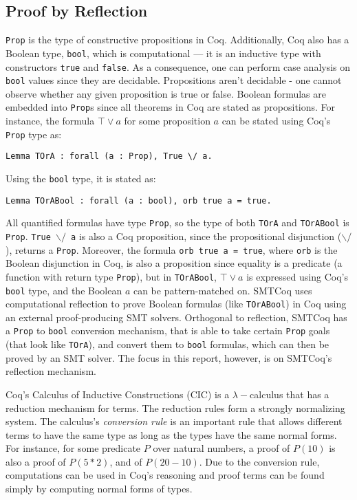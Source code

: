 \documentclass{article}
\begin{document}
	\subsection{Proof by Reflection}
	\label{reflect}
	\texttt{Prop} is the type of 
	constructive propositions in Coq. 
	Additionally, Coq also has a 
	Boolean type, \texttt{bool}, which 
	is computational --- it is an 
	inductive type with constructors 
	\texttt{true} and \texttt{false}. 
	As a consequence, one can 
	perform case analysis on 
	\texttt{bool} values since they 
	are decidable. Propositions 
	aren't decidable - one cannot 
	observe whether any given 
	proposition is true or false. 
	Boolean formulas are embedded 
	into \texttt{Prop}s since all 
	theorems in Coq are stated as 
	propositions. For instance, the 
	formula 
	$\top \lor a$ for some 
	proposition $a$ can be stated 
	using Coq's \texttt{Prop} type as:
\begin{verbatim}
Lemma TOrA : forall (a : Prop), True \/ a.
\end{verbatim}
	Using the \texttt{bool} type, it 
	is stated as:
\begin{verbatim}
Lemma TOrABool : forall (a : bool), orb true a = true.
\end{verbatim}
 	All quantified formulas have type
 	\texttt{Prop}, so the type of both
 	\texttt{TOrA} and \texttt{TOrABool}
 	is \texttt{Prop}. 
 	\texttt{True $\backslash/$ a}
 	is also a Coq proposition, since 
 	the propositional disjunction
 	(\texttt{$\backslash/$}), returns a 
 	\texttt{Prop}. Moreover, the 
 	formula \texttt{orb true a = true}, 
 	where \texttt{orb} is the 
 	Boolean disjunction in Coq, 
 	is also a proposition since 
 	equality is a predicate 
 	(a function with return 
 	type \texttt{Prop}), but in 
 	\texttt{TOrABool}, $\top \lor a$ 
 	is expressed using Coq's 
 	\texttt{bool} type, and the 
 	Boolean $a$ can be pattern-matched 
 	on. SMTCoq uses computational 
 	reflection to prove Boolean 
 	formulas (like \texttt{TOrABool})
 	in Coq using an external 
	proof-producing SMT solvers. 
	Orthogonal to reflection, 
	SMTCoq has a \texttt{Prop} to 
	\texttt{bool} conversion 
	mechanism, that is able to take 
	certain \texttt{Prop}
	goals (that look like 
	\texttt{TOrA}), and convert 
	them to \texttt{bool} formulas, 
	which can then be proved by 
	an SMT solver. The focus in 
	this report, however,  
	is on SMTCoq's reflection 
	mechanism.
	 
	Coq's Calculus of Inductive 
	Constructions (CIC) is a 
	$\lambda-$calculus that has a 
	reduction mechanism for terms. The
	reduction rules form a strongly 
	normalizing system. The calculus's
	\textit{conversion rule} is an 
	important rule that allows different 
	terms to have the same type as 
	long as the types have the same 
	normal forms. For instance, for some 
	predicate $P$ over natural numbers, 
	a proof of $P(10)$ is also a proof 
	of $P(5*2)$, and of $P(20-10)$. Due 
	to the conversion rule, computations 
	can be used in Coq's reasoning and 
	proof terms can be found simply by 
	computing normal forms of types.
	
\end{document}
